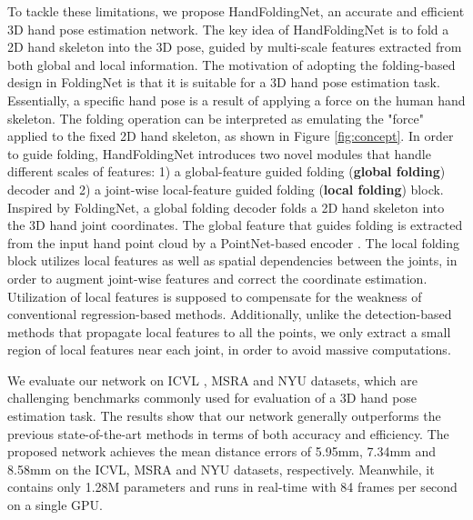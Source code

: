 \documentclass[10pt,twocolumn,letterpaper]{article}
\begin{document}
To tackle these limitations, we propose HandFoldingNet, an accurate and efficient 3D hand pose estimation network. The key idea of HandFoldingNet is to fold a 2D hand skeleton into the 3D pose, guided by multi-scale features extracted from both global and local information.
The motivation of adopting the folding-based design in FoldingNet \cite{yang2018foldingnet} is that it is suitable for a 3D hand pose estimation task. Essentially, a specific hand pose is a result of applying a force on the human hand skeleton. The folding operation can be interpreted as emulating the "force" applied to the fixed 2D hand skeleton, as shown in Figure \ref{fig:concept}. 
In order to guide folding, HandFoldingNet introduces two novel modules that handle different scales of features: 1) a global-feature guided folding (\textbf{global folding}) decoder and 2) a joint-wise local-feature guided folding (\textbf{local folding}) block. Inspired by FoldingNet, a global folding decoder folds a 2D hand skeleton into the 3D hand joint coordinates. The global feature that guides folding is extracted from the input hand point cloud by a PointNet-based encoder \cite{qi2017pointnet++, ge2018hand, ge2018point}. The local folding block utilizes local features as well as spatial dependencies between the joints, in order to augment joint-wise features and correct the coordinate estimation. Utilization of local features is supposed to compensate for the weakness of conventional regression-based methods. Additionally, unlike the detection-based methods that propagate local features to all the points, we only extract a small region of local features near each joint, in order to avoid massive computations. 

We evaluate our network on ICVL \cite{tang2014latent}, MSRA \cite{sun2015cascaded} and NYU \cite{tompson2014real} datasets, which are challenging benchmarks commonly used for evaluation of a 3D hand pose estimation task. The results show that our network generally outperforms the previous state-of-the-art methods in terms of both accuracy and efficiency. The proposed network achieves the mean distance errors of 5.95mm, 7.34mm and 8.58mm on the ICVL, MSRA and NYU datasets, respectively.
Meanwhile, it contains only 1.28M parameters and runs in real-time with 84 frames per second on a single GPU. 
\end{document}
